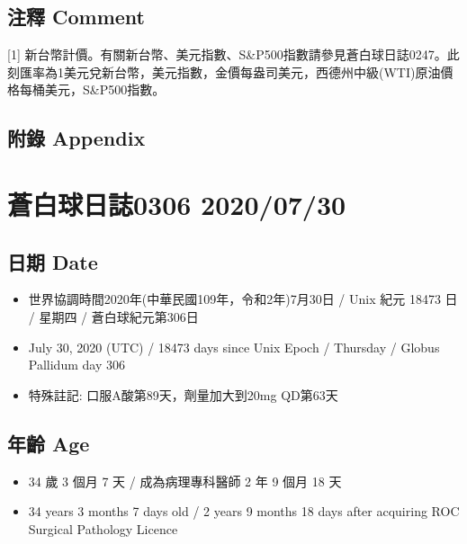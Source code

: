 \documentclass[
]{article}
\providecommand{\tightlist}{%
  \setlength{\itemsep}{0pt}\setlength{\parskip}{0pt}}
\begin{document}
\hypertarget{ux6ce8ux91cb-comment-28}{%
\subsection{注釋 Comment}\label{ux6ce8ux91cb-comment-28}}

{[}1{]}
新台幣計價。有關新台幣、美元指數、S\&P500指數請參見蒼白球日誌0247。此刻匯率為1美元兌新台幣，美元指數，金價每盎司美元，西德州中級(WTI)原油價格每桶美元，S\&P500指數。

\hypertarget{ux9644ux9304-appendix-28}{%
\subsection{附錄 Appendix}\label{ux9644ux9304-appendix-28}}

\hypertarget{ux84bcux767dux7403ux65e5ux8a8c0306-20200730}{%
\section{蒼白球日誌0306
2020/07/30}\label{ux84bcux767dux7403ux65e5ux8a8c0306-20200730}}

\hypertarget{ux65e5ux671f-date-29}{%
\subsection{日期 Date}\label{ux65e5ux671f-date-29}}

\begin{itemize}
\tightlist
\item
  世界協調時間2020年(中華民國109年，令和2年)7月30日 / Unix 紀元 18473 日
  / 星期四 / 蒼白球紀元第306日
\item
  July 30, 2020 (UTC) / 18473 days since Unix Epoch / Thursday / Globus
  Pallidum day 306
\item
  特殊註記: 口服A酸第89天，劑量加大到20mg QD第63天
\end{itemize}

\hypertarget{ux5e74ux9f61-age-29}{%
\subsection{年齡 Age}\label{ux5e74ux9f61-age-29}}

\begin{itemize}
\tightlist
\item
  34 歲 3 個月 7 天 / 成為病理專科醫師 2 年 9 個月 18 天
\item
  34 years 3 months 7 days old / 2 years 9 months 18 days after
  acquiring ROC Surgical Pathology Licence
\end{itemize}
\end{document}
